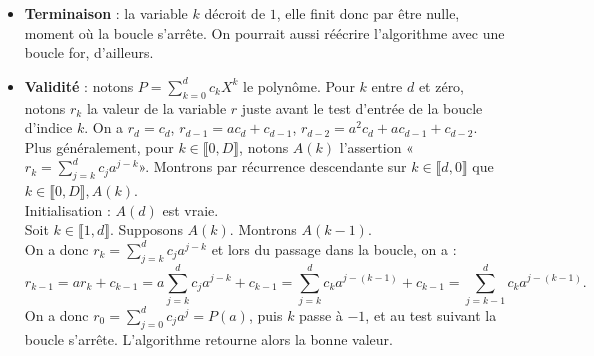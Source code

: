 \documentclass[11pt,a4paper]{article}
\begin{document}
\begin{itemize}

\item \textbf{Terminaison} : la variable $k$ décroit de $1$, elle finit donc par être nulle, moment où la boucle s'arrête. On pourrait aussi réécrire l'algorithme avec une boucle \og for\fg, d'ailleurs.
\item \textbf{Validité} : notons $P = \sum_{k=0}^d c_kX^k$ le polynôme.
Pour $k$ entre $d$ et zéro, notons $r_k$ la valeur de la variable $r$ juste avant le test d'entrée de la boucle d'indice $k$. 
On a $r_d = c_d$, $r_{d-1} = ac_d+c_{d-1}$, $r_{d-2} = a^2c_d + ac_{d-1}+c_{d-2}$.
Plus généralement, pour $k \in \llbracket 0,D\rrbracket$, notons $A(k)$ l'assertion «$r_k = \sum_{j=k}^{d}c_ja^{j-k}$».
Montrons par récurrence descendante sur $k \in \llbracket d,0\rrbracket$ que $k \in \llbracket 0,D\rrbracket, A(k)$.\\
Initialisation : $A(d)$ est vraie.\\
Soit $k \in \llbracket 1,d\rrbracket$. Supposons $A(k)$. Montrons $A(k-1)$.\\ 
On a donc $r_k = \sum_{j=k}^{d}c_ja^{j-k}$ et lors du passage dans la boucle, on a :
\[
r_{k-1} = ar_k+c_{k-1} 
= a\sum_{j=k}^{d}c_ja^{j-k} + c_{k-1} 
= \sum_{j=k}^{d}c_ka^{j-(k-1)} + c_{k-1}
 = \sum_{j=k-1}^{d}c_ka^{j-(k-1)}.
\]
On a donc $r_0 = \sum_{j=0}^{d}c_ja^{j} = P(a)$, puis $k$ passe à $-1$, et au test suivant la boucle s'arrête.  L'algorithme retourne alors la bonne valeur.
\end{itemize}
\end{document}

